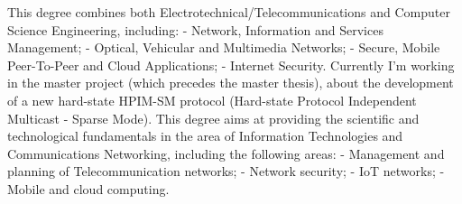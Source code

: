 \documentclass[
	a4paper,
]{fortysecondscv}
\begin{document}
\makefrontsidebar

\begin{cvtable}[3]
\end{cvtable}
\begin{cvtable}[3]
\end{cvtable}

\begin{cvtable}[1.5]
		{This degree combines both Electrotechnical/Telecommunications and Computer Science Engineering, including:\newline
		 - Network, Information and Services Management;\newline
		 - Optical, Vehicular and Multimedia Networks;\newline
		 - Secure, Mobile Peer-To-Peer and Cloud Applications;\newline
		 - Internet Security.\newline
		 Currently I'm working in the master project (which precedes the master thesis), about the development of a new hard-state HPIM-SM protocol (Hard-state Protocol Independent Multicast - Sparse Mode).}
		{This degree aims at providing the scientific and technological fundamentals in the area of Information Technologies and Communications Networking, including the following areas:\newline
		 - Management and planning of Telecommunication networks;\newline
		 - Network security;\newline
		 - IoT networks;\newline
		 - Mobile and cloud computing.}
\end{cvtable}
\end{document}
